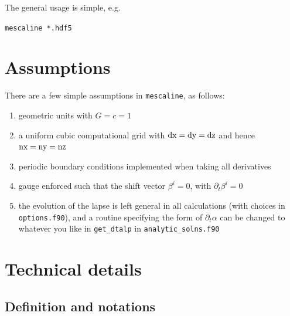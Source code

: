 \documentclass[a4paper]{article}
\newcommand{\alp}{\alpha}
\newcommand{\pd}{\partial}
\begin{document}
The general usage is simple, e.g.

\vspace{2mm}
\texttt{mescaline *.hdf5}
\vspace{2mm}


\section{Assumptions}\label{sec:assumptions}

There are a few simple assumptions in \texttt{mescaline}, as follows:
\begin{enumerate}
	\item geometric units with $G=c=1$
	\item a uniform cubic computational grid with ${\rm dx = dy = dz}$ and hence ${\rm nx = ny = nz}$	
	\item periodic boundary conditions implemented when taking all derivatives
	\item gauge enforced such that the shift vector $\beta^i=0$, with $\pd_t \beta^i = 0$
	\item the evolution of the lapse is left general in all calculations (with choices in \texttt{options.f90}), and a routine specifying the form of $\pd_t \alp$ can be changed to whatever you like in \texttt{get\_dtalp} in \texttt{analytic\_solns.f90}
\end{enumerate}

\section{Technical details}


\subsection{Definition and notations}
\end{document}
